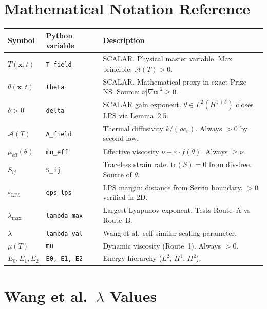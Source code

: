 \documentclass[11pt, a4paper]{article}
\theoremstyle{definition}
\theoremstyle{remark}
\newcommand{\Afield}{\mathcal{A}}
\newcommand{\eps}{\varepsilon}
\newcommand{\lam}{\lambda}
\newcommand{\thet}{\theta}
\newcommand{\mueff}{\mu_{\mathrm{eff}}}
\newcommand{\epslps}{\eps_{\mathrm{LPS}}}
\newcommand{\delt}{\delta}
\begin{document}
\clearpage
\appendix

\section{Mathematical Notation Reference}
\label{app:notation}

\begin{center}
\begin{tabular}{lll}
\toprule
\textbf{Symbol} & \textbf{Python variable} & \textbf{Description} \\
\midrule
$T(\mathbf{x},t)$ & \texttt{T\_field} & SCALAR. Physical master variable. Max principle. $\Afield(T)>0$. \\
$\thet(\mathbf{x},t)$ & \texttt{theta} & SCALAR. Mathematical proxy in exact Prize NS. Source: $\nu|\nabla\mathbf{u}|^2\geq 0$. \\
$\delt > 0$ & \texttt{delta} & SCALAR gain exponent. $\thet\in L^2(H^{1+\delt})$ closes LPS via Lemma~2.5. \\
$\Afield(T)$ & \texttt{A\_field} & Thermal diffusivity $k/(\rho c_v)$. Always $>0$ by second law. \\
$\mueff(\thet)$ & \texttt{mu\_eff} & Effective viscosity $\nu + \eps\cdot f(\thet)$. Always $\geq\nu$. \\
$S_{ij}$ & \texttt{S\_ij} & Traceless strain rate. $\mathrm{tr}(S) = 0$ from div-free. Source of $\thet$. \\
$\epslps$ & \texttt{eps\_lps} & LPS margin: distance from Serrin boundary. $>0$ verified in 2D. \\
$\lambda_{\max}$ & \texttt{lambda\_max} & Largest Lyapunov exponent. Tests Route~A vs Route~B. \\
$\lam$ & \texttt{lambda\_val} & Wang et al.\ self-similar scaling parameter. \\
$\mu(T)$ & \texttt{mu} & Dynamic viscosity (Route~1). Always $>0$. \\
$E_0, E_1, E_2$ & \texttt{E0, E1, E2} & Energy hierarchy ($L^2$, $H^1$, $H^2$). \\
\bottomrule
\end{tabular}
\end{center}

\section{Wang et al.\ $\lambda$ Values}
\label{app:wang-lambda}
\end{document}
